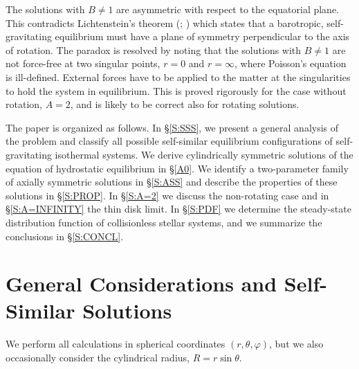 The solutions with $B\not=1$ are asymmetric with respect to the equatorial
plane. This contradicts Lichtenstein's theorem (\cite{Lich}; \cite{Wavre}) 
which states that a barotropic, self-gravitating equilibrium must have a 
plane of symmetry perpendicular to the axis of rotation. The paradox is 
resolved by noting that the solutions with $B\not=1$ are not force-free at two 
singular points, $r=0$ and $r=\infty$, where Poisson's equation is 
ill-defined. External forces have to be applied to the matter at 
the singularities to hold the system in equilibrium. This is proved 
rigorously for the case without rotation, $A=2$, and is likely to be 
correct also for rotating solutions. 

The paper is organized as follows. In \S \ref{S:SSS}, we present a general
analysis of the problem and classify all possible self-similar equilibrium
configurations of self-gravitating isothermal systems. We derive cylindrically 
symmetric solutions of the equation of hydrostatic equilibrium in \S \ref{A0}. 
We identify a two-parameter family of axially symmetric solutions in 
\S \ref{S:ASS} and describe the properties of these solutions 
in \S \ref{S:PROP}. In \S \ref{S:A=2} we discuss the non-rotating case and in 
\S \ref{S:A=INFINITY} the thin disk limit. In \S \ref{S:PDF} we determine the 
steady-state distribution function of collisionless stellar systems, and we 
summarize the conclusions in \S \ref{S:CONCL}.


\section{General Considerations and Self-Similar Solutions \label{S:SSS}}

We perform all calculations in spherical coordinates $(r,\theta,\varphi)$, 
but we also occasionally consider the cylindrical radius, $R=r\sin\theta$.


